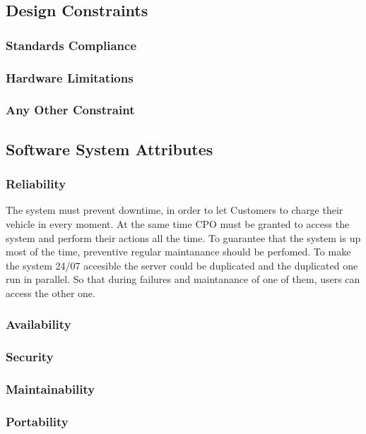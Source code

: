 \subsection{Design Constraints}
\subsubsection{Standards Compliance}
\subsubsection{Hardware Limitations}
\subsubsection{Any Other Constraint}

\subsection{Software System Attributes}
\subsubsection{Reliability}
The system must prevent downtime, in order to let Customers to charge their vehicle in every moment. At the same time CPO must be granted to access the system and perform their actions all the time.
To guarantee that the system is up most of the time, preventive regular maintanance should be perfomed. To make the system 24/07 accesible the server could be duplicated and the duplicated one run in parallel. So that during failures and maintanance of one of them, users can access the other one.
\subsubsection{Availability}
\subsubsection{Security}
\subsubsection{Maintainability}
\subsubsection{Portability}
